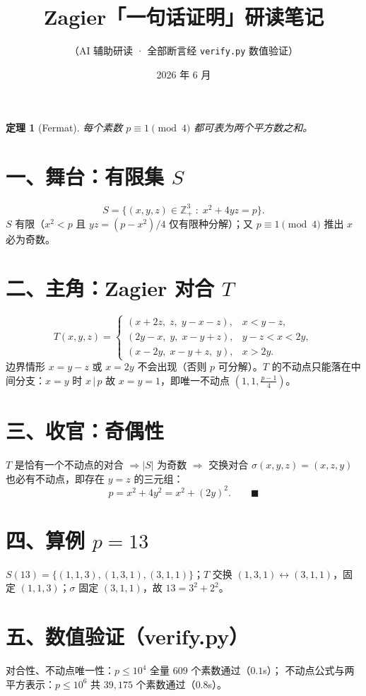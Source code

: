 \documentclass[11pt]{article}
\title{Zagier「一句话证明」研读笔记}
\author{（AI 辅助研读 · 全部断言经 \texttt{verify.py} 数值验证）}
\date{2026 年 6 月}
\newtheorem{theorem}{定理}
\begin{document}
\maketitle

\begin{theorem}[Fermat]
每个素数 $p \equiv 1 \pmod 4$ 都可表为两个平方数之和。
\end{theorem}

\section*{一、舞台：有限集 $S$}
\[
S=\{(x,y,z)\in\mathbb{Z}_{+}^{3}\;:\;x^{2}+4yz=p\}.
\]
$S$ 有限（$x^{2}<p$ 且 $yz=(p-x^{2})/4$ 仅有限种分解）；又 $p\equiv1\pmod4$ 推出 $x$ 必为奇数。

\section*{二、主角：Zagier 对合 $T$}
\[
T(x,y,z)=
\begin{cases}
(x+2z,\; z,\; y-x-z), & x<y-z,\\[2pt]
(2y-x,\; y,\; x-y+z), & y-z<x<2y,\\[2pt]
(x-2y,\; x-y+z,\; y), & x>2y.
\end{cases}
\]
边界情形 $x=y-z$ 或 $x=2y$ 不会出现（否则 $p$ 可分解）。$T$ 的不动点只能落在中间分支：$x=y$ 时 $x\,|\,p$ 故 $x=y=1$，即唯一不动点 $(1,1,\tfrac{p-1}{4})$。

\section*{三、收官：奇偶性}
$T$ 是恰有一个不动点的对合 $\Rightarrow|S|$ 为奇数 $\Rightarrow$ 交换对合 $\sigma(x,y,z)=(x,z,y)$ 也必有不动点，即存在 $y=z$ 的三元组：
\[
p=x^{2}+4y^{2}=x^{2}+(2y)^{2}.\qquad\blacksquare
\]

\section*{四、算例 $p=13$}
$S(13)=\{(1,1,3),(1,3,1),(3,1,1)\}$；$T$ 交换 $(1,3,1)\leftrightarrow(3,1,1)$，固定 $(1,1,3)$；$\sigma$ 固定 $(3,1,1)$，故 $13=3^{2}+2^{2}$。

\section*{五、数值验证（verify.py）}
对合性、不动点唯一性：$p\le 10^{4}$ 全量 $609$ 个素数通过（$0.1$s）；
不动点公式与两平方表示：$p\le 10^{6}$ 共 $39{,}175$ 个素数通过（$0.8$s）。
\end{document}

